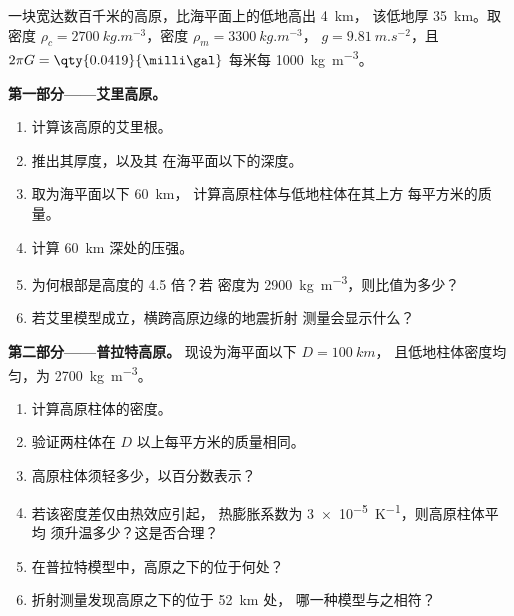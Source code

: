 \begin{problem}
\label{pb:b1:isostasy-gravity:1}
一块宽达数百千米的高原，比海平面上的低地高出 \qty{4}{km}，
该低地厚 \qty{35}{km}。取
密度 $\rho_c = \qty{2700}{kg.m^{-3}}$，密度 $\rho_m = \qty{3300}{kg.m^{-3}}$，
$g = \qty{9.81}{m.s^{-2}}$，且
$2\pi G = \qty{0.0419}{\milli\gal}$ 每米每 \qty{1000}{kg.m^{-3}}。

\medskip
\noindent\textbf{第一部分——艾里高原。}
\begin{enumerate}
  \item 计算该高原的艾里根。
  \item 推出其厚度，以及其
        在海平面以下的深度。
  \item 取为海平面以下 \qty{60}{km}，
        计算高原柱体与低地柱体在其上方
        每平方米的质量。
  \item 计算 \qty{60}{km} 深处的压强。
  \item 为何根部是高度的 4.5 倍？若
        密度为 \qty{2900}{kg.m^{-3}}，则比值为多少？
  \item 若艾里模型成立，横跨高原边缘的地震折射
        测量会显示什么？
\end{enumerate}

\noindent\textbf{第二部分——普拉特高原。}
现设为海平面以下 $D = \qty{100}{km}$，
且低地柱体密度均匀，为 \qty{2700}{kg.m^{-3}}。
\begin{enumerate}[resume]
  \item 计算高原柱体的密度。
  \item 验证两柱体在
        $D$ 以上每平方米的质量相同。
  \item 高原柱体须轻多少，以百分数表示？
  \item 若该密度差仅由热效应引起，
        热膨胀系数为 \qty{3e-5}{K^{-1}}，则高原柱体平均
        须升温多少？这是否合理？
  \item 在普拉特模型中，高原之下的位于何处？
  \item 折射测量发现高原之下的位于 \qty{52}{km} 处，
        哪一种模型与之相符？
\end{enumerate}


\end{problem}
